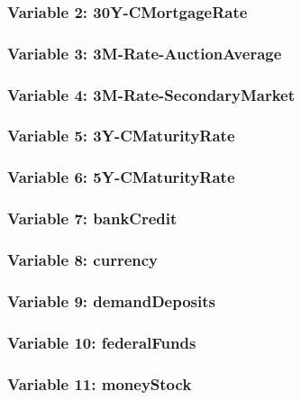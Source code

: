 \documentclass[12pt,a4paper]{article}
\begin{document}
\subsubsection*{Variable 2: 30Y-CMortgageRate}



\subsubsection*{Variable 3: 3M-Rate-AuctionAverage}



\subsubsection*{Variable 4: 3M-Rate-SecondaryMarket}



\subsubsection*{Variable 5: 3Y-CMaturityRate}



\subsubsection*{Variable 6: 5Y-CMaturityRate}



\subsubsection*{Variable 7: bankCredit}



\subsubsection*{Variable 8: currency}



\subsubsection*{Variable 9: demandDeposits}



\subsubsection*{Variable 10: federalFunds}



\subsubsection*{Variable 11: moneyStock}
\end{document}
